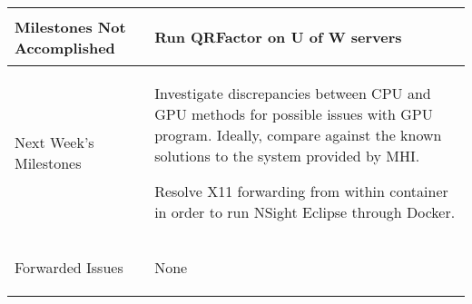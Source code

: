 \documentclass[11pt,letterpaper]{article}
\begin{document}
\begin{tabular}{| p{} | p{} |}
	Milestones Not \newline Accomplished & \begin{enumerate*}
	\item[\tiny\textbullet] Run QRFactor on U of W servers
	\end{enumerate*} \\ \hline

	Next Week's \newline Milestones & \begin{enumerate*}
	\item[\tiny\textbullet] Investigate discrepancies between CPU and GPU methods for possible issues with GPU program. Ideally, compare against the known solutions to the system provided by MHI. \newline
  \item[\tiny\textbullet] Resolve X11 forwarding from within container in order to run NSight Eclipse through Docker.
	\end{enumerate*} \\ \hline

	Forwarded Issues & \begin{enumerate*}
	\item[\tiny\textbullet] None
	\end{enumerate*} \\ \hline
\end{tabular}
\end{document}
